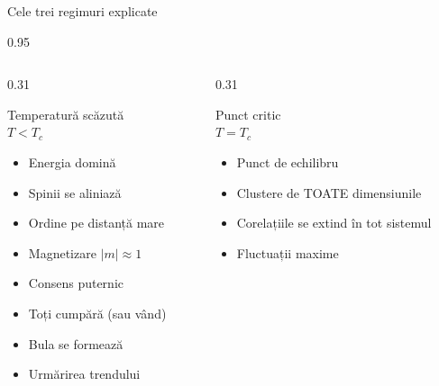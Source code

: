 \documentclass[9pt, aspectratio=169, t]{beamer}
\begin{document}
\begin{frame}{Cele trei regimuri explicate}
    \begin{cminipage}{0.95\textwidth}
    {\footnotesize
    \begin{columns}[T]
        \begin{column}{0.31\textwidth}
            \begin{exampleblock}{Temperatură scăzută\\$T < T_c$}
                \begin{itemize}\setlength{\itemsep}{0pt}
                    \item Energia domină
                    \item Spinii se aliniază
                    \item Ordine pe distanță mare
                    \item Magnetizare $|m| \approx 1$
                \end{itemize}

                \begin{itemize}\setlength{\itemsep}{0pt}
                    \item Consens puternic
                    \item Toți cumpără (sau vând)
                    \item Bula se formează
                    \item Urmărirea trendului
                \end{itemize}
            \end{exampleblock}
        \end{column}
        \begin{column}{0.31\textwidth}
            \begin{alertblock}{Punct critic\\$T = T_c$}
                \begin{itemize}\setlength{\itemsep}{0pt}
                    \item Punct de echilibru
                    \item Clustere de TOATE dimensiunile
                    \item Corelațiile se extind în tot sistemul
                    \item Fluctuații maxime
                \end{itemize}


\end{alertblock}
\end{column}
\end{columns}}
\end{cminipage}
\end{frame}
\end{document}
